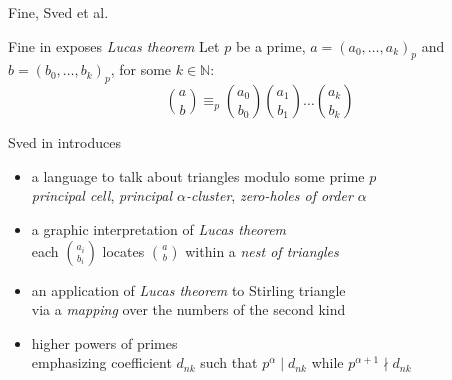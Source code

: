 \documentclass[10pt,serif, professionalfont]{beamer}
\begin{document}
\begin{frame}{Fine, Sved et al.}

    \begin{block}{Fine in \cite{Fine1947} exposes \emph{Lucas theorem}}
        Let $p$ be a prime, $a=(a_{0},\ldots,a_{k})_{p}$ and $b=(b_{0},\ldots,b_{k})_{p}$, for some $k\in\mathbb{N}$:
        \begin{displaymath}
            {{a}\choose{b}} \equiv_{p} {{a_{0}}\choose{b_{0}}}{{a_{1}}\choose{b_{1}}}
                \ldots{{a_{k}}\choose{b_{k}}}
        \end{displaymath}
    \end{block}
    \pause
    \begin{block}{Sved in \cite{Sved1998} introduces}
        \begin{itemize}
            \item {\normalsize a language to talk about triangles modulo some prime $p$}\\
                \footnotesize{\emph{principal cell}, \emph{principal $\alpha$-cluster}, \emph{zero-holes of order $\alpha$}}
            \item {\normalsize a graphic interpretation of \emph{Lucas theorem} }\\
                \footnotesize{each ${{a_i}\choose{b_i}}$ locates ${{a}\choose{b}}$ within a \emph{nest of triangles}}
            \item {\normalsize an application of \emph{Lucas theorem} to Stirling triangle}\\
                \footnotesize{via a \emph{mapping} over the numbers of the second kind}
            \item {\normalsize higher powers of primes}\\
                \footnotesize{emphasizing coefficient $d_{nk}$ such that 
                    $p^{\alpha}\mid d_{nk}$ while $p^{\alpha+1}\nmid d_{nk}$}
        \end{itemize}
    \end{block}
\end{frame}
\end{document}
